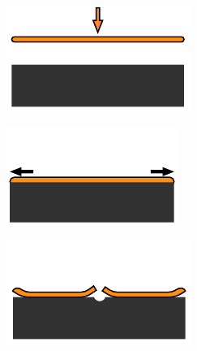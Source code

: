 \documentclass[final]{jyflluk}
\begin{document}
\begin{figure}[h]
    \centering
    \begin{subfigure}[ht]{0.3\textwidth}
        \centering
        \includegraphics[width=\linewidth]{images/tensile1.pdf} 
        \caption{} \label{fig:desisdfsdfgn1}
    \end{subfigure}
    \hfill
    \begin{subfigure}[ht]{0.3\textwidth}
        \centering
        \includegraphics[width=\linewidth]{images/tensile2.pdf} 
        \caption{} \label{fig:flosdfsdfw1}
    \end{subfigure}
    \hfill
    \begin{subfigure}[ht]{0.3\textwidth}
        \centering
        \includegraphics[width=\linewidth]{images/tensile3.pdf} 

\end{subfigure}
\end{figure}
\end{document}
